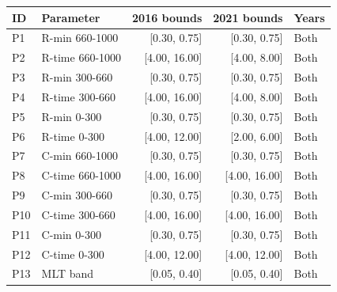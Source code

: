 \begin{tabular}{@{}llrrl@{}}
\toprule
ID & Parameter & 2016 bounds & 2021 bounds & Years \\
\midrule
P1 & R-min 660-1000 & [0.30, 0.75] & [0.30, 0.75] & Both \\
P2 & R-time 660-1000 & [4.00, 16.00] & [4.00, 8.00] & Both \\
P3 & R-min 300-660 & [0.30, 0.75] & [0.30, 0.75] & Both \\
P4 & R-time 300-660 & [4.00, 16.00] & [4.00, 8.00] & Both \\
P5 & R-min 0-300 & [0.30, 0.75] & [0.30, 0.75] & Both \\
P6 & R-time 0-300 & [4.00, 12.00] & [2.00, 6.00] & Both \\
P7 & C-min 660-1000 & [0.30, 0.75] & [0.30, 0.75] & Both \\
P8 & C-time 660-1000 & [4.00, 16.00] & [4.00, 16.00] & Both \\
P9 & C-min 300-660 & [0.30, 0.75] & [0.30, 0.75] & Both \\
P10 & C-time 300-660 & [4.00, 16.00] & [4.00, 16.00] & Both \\
P11 & C-min 0-300 & [0.30, 0.75] & [0.30, 0.75] & Both \\
P12 & C-time 0-300 & [4.00, 12.00] & [4.00, 12.00] & Both \\
P13 & MLT band & [0.05, 0.40] & [0.05, 0.40] & Both \\
\bottomrule
\end{tabular}
